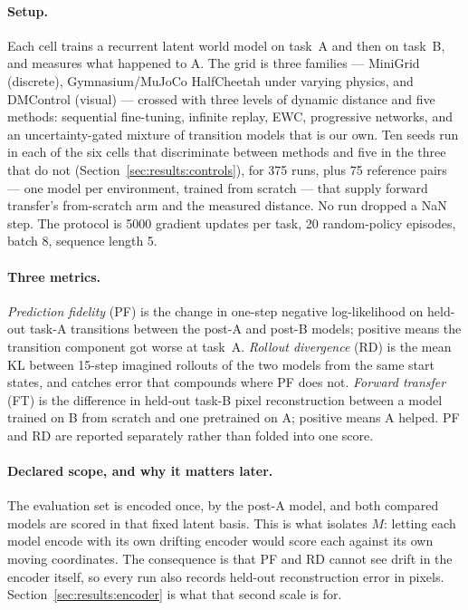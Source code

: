 \documentclass[11pt]{article}
\begin{document}
\paragraph{Setup.} Each cell trains a recurrent latent world model
\citep{hafner2019planet} on task~A and then on task~B, and measures what
happened to A. The grid is three families --- MiniGrid (discrete),
Gymnasium/MuJoCo HalfCheetah under varying physics, and DMControl (visual) ---
crossed with three levels of dynamic distance and five methods: sequential
fine-tuning, infinite replay, EWC, progressive networks, and an
uncertainty-gated mixture of transition models that is our own. Ten seeds run
in each of the six cells that discriminate between methods and five in the
three that do not (Section~\ref{sec:results:controls}), for 375 runs, plus 75
reference pairs --- one model per environment, trained from scratch --- that
supply forward transfer's from-scratch arm and the measured distance. No run
dropped a NaN step. The protocol is 5000 gradient updates per task, 20
random-policy episodes, batch 8, sequence length 5.

\paragraph{Three metrics.} \emph{Prediction fidelity} (PF) is the change in
one-step negative log-likelihood on held-out task-A transitions between the
post-A and post-B models; positive means the transition component got worse at
task~A. \emph{Rollout divergence} (RD) is the mean KL between 15-step imagined
rollouts of the two models from the same start states, and catches error that
compounds where PF does not. \emph{Forward transfer} (FT) is the difference in
held-out task-B pixel reconstruction between a model trained on B from scratch
and one pretrained on A; positive means A helped. PF and RD are reported
separately rather than folded into one score.

\paragraph{Declared scope, and why it matters later.} The evaluation set is
encoded once, by the post-A model, and both compared models are scored in that
fixed latent basis. This is what isolates $M$: letting each model encode with
its own drifting encoder would score each against its own moving coordinates.
The consequence is that PF and RD cannot see drift in the encoder itself, so
every run also records held-out reconstruction error in pixels.
Section~\ref{sec:results:encoder} is what that second scale is for.
\end{document}
